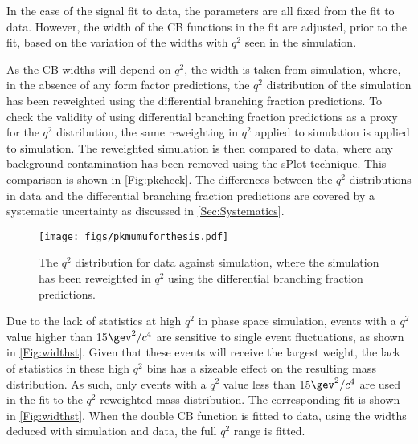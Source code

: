 In the case of the signal fit to \Lbpi data, the parameters are all fixed from the fit to \Lbpijpsi data. However, the width of the CB functions in the \Lbpi fit are adjusted, prior to the fit, based on the variation of the widths with $q^{2}$ seen in the simulation.


As the CB widths will depend on $q^{2}$, the width is taken from \Lbpi simulation, where, in the absence of any form factor predictions, the $q^{2}$ distribution of the simulation has been reweighted using the \LbL differential branching fraction predictions. To check the validity of using \LbL differential branching fraction predictions as a proxy for the \Lbpi $q^{2}$ distribution, the same reweighting in $q^{2}$ applied to \Lbpi simulation is applied to \LbK simulation. The reweighted \LbK simulation is then compared to \LbK data, where any background contamination has been removed using the sPlot technique. This comparison is shown in \autoref{Fig:pkcheck}. The differences between the $q^{2}$ distributions in \LbK data and the \LbL differential branching fraction predictions are covered by a systematic uncertainty as discussed in \autoref{Sec:Systematics}.
\begin{figure}[!ht]\def\nh{0.3\textwidth}
  \centering
  \texttt{[image: figs/pkmumuforthesis.pdf]}
    \caption{The $q^{2}$ distribution for \LbK data against \LbK simulation, where the \LbK simulation has been reweighted in $q^{2}$ using the \LbL differential branching fraction predictions.}
    \label{Fig:pkcheck}
\end{figure}

Due to the lack of statistics at high $q^{2}$ in \Lbpi phase space simulation, events with a $q^{2}$ value higher than 15$\gev^{2}/c^{4}$ are sensitive to single event fluctuations, as shown in \autoref{Fig:widthst}\protect{}. Given that these events will receive the largest weight, the lack of statistics in these high $q^{2}$ bins has a sizeable effect on the resulting mass distribution. As such, only events with a $q^{2}$ value less than 15$\gev^{2}/c^{4}$ are used in the fit to the $q^{2}$-reweighted \Lbpi mass distribution. The corresponding fit is shown in \autoref{Fig:widthst}\protect{}. When the double CB function is fitted to \Lbpi data, using the widths deduced with simulation and \Lbpijpsi data, the full $q^{2}$ range is fitted. 

